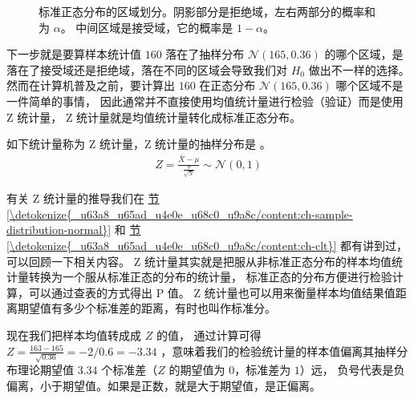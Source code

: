 \documentclass[letterpaper,10pt,english]{sphinxmanual}
\begin{document}
\begin{figure}[htbp]
\centering
\capstart

\noindent{}
\caption{标准正态分布的区域划分。阴影部分是拒绝域，左右两部分的概率和为 \(\alpha\)。
中间区域是接受域，它的概率是 \(1-\alpha\)。}\label{\detokenize{_u63a8_u65ad_u4e0e_u68c0_u9a8c/content:id30}}\label{\detokenize{_u63a8_u65ad_u4e0e_u68c0_u9a8c/content:pic-influence-me-100}}\end{figure}

下一步就是要算样本统计值 \(160\) 落在了抽样分布 \(\mathcal{N}(165,0.36)\)
的哪个区域，是落在了接受域还是拒绝域，落在不同的区域会导致我们对 \(H_0\)
做出不一样的选择。
然而在计算机普及之前，要计算出 \(160\) 在正态分布 \(\mathcal{N}(165,0.36)\)
哪个区域不是一件简单的事情，
因此通常并不直接使用均值统计量进行检验（验证）而是使用 Z 统计量，
Z 统计量就是均值统计量转化成标准正态分布。

\begin{sphinxShadowBox}

如下统计量称为 Z 统计量，Z 统计量的抽样分布是 。
\begin{equation}\label{equation:推断与检验/content:推断与检验/content:88}
\begin{split}Z = \frac{\bar{X} - \mu}{\frac{\sigma}{\sqrt{N}}} \sim \mathcal{N}(0,1)\end{split}
\end{equation}\end{sphinxShadowBox}

有关 Z 统计量的推导我们在
\hyperref[\detokenize{_u63a8_u65ad_u4e0e_u68c0_u9a8c/content:ch-sample-distribution-normal}]{节 \ref{\detokenize{_u63a8_u65ad_u4e0e_u68c0_u9a8c/content:ch-sample-distribution-normal}}}
和 \hyperref[\detokenize{_u63a8_u65ad_u4e0e_u68c0_u9a8c/content:ch-clt}]{节 \ref{\detokenize{_u63a8_u65ad_u4e0e_u68c0_u9a8c/content:ch-clt}}} 都有讲到过，可以回顾一下相关内容。
Z 统计量其实就是把服从非标准正态分布的样本均值统计量转换为一个服从标准正态的分布的统计量，
标准正态的分布方便进行检验计算，可以通过查表的方式得出 P 值。
Z 统计量也可以用来衡量样本均值结果值距离期望值有多少个标准差的距离，有时也叫作标准分。

现在我们把样本均值转成成 \(Z\) 的值，
通过计算可得 \(Z=\frac{163-165}{\sqrt{0.36}}=-2/0.6=-3.34\)
，意味着我们的检验统计量的样本值偏离其抽样分布理论期望值 \(3.34\)
个标准差（\(Z\) 的期望值为 \(0\)，标准差为 \(1\)）远，
负号代表是负偏离，小于期望值。如果是正数，就是大于期望值，是正偏离。
\end{document}
